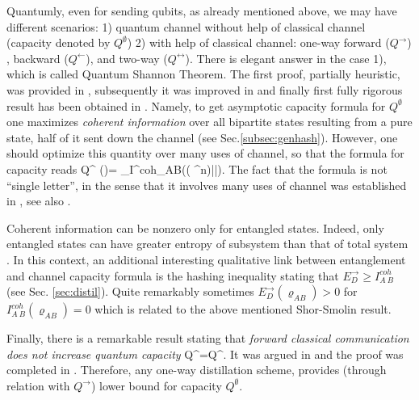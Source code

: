 \documentclass[rmp,12pt,preprint]{revtex4-2}
\begin{document}
Quantumly, even for sending qubits, as already mentioned above, we
may have different scenarios: 1) quantum channel without help of
classical channel (capacity denoted by $Q^{ \emptyset }$) 2) with
help of classical channel: one-way forward ($Q^{ \rightarrow }$) ,
backward ($Q^{ \leftarrow }$), and two-way ($Q^{ \leftrightarrow
}$). There is elegant answer in the case 1), which is called Quantum
Shannon Theorem. The first proof, partially heuristic, was provided
in \cite{Lloyd-cap}, subsequently it was improved in
\cite{Shor-cap-notes} and finally first fully rigorous result has been obtained
in \cite{Devetak2003}. Namely, to get asymptotic capacity
formula for $Q^{ \emptyset}$ one maximizes {\it coherent
information} over all bipartite states resulting from a pure state, half of it sent down the channel (see Sec.\ref{subsec:genhash}). However, one should optimize this quantity over many uses of channel, so that the formula for capacity reads
\be
Q^{ \emptyset }(\Lambda)=  \sup_\psi I^{coh}_{A\>B}((\id\ot
\Lambda^{\ot n})|\psi\>\<\psi|).
\ee
The fact that the formula is not ``single letter'', in the sense that it involves many uses of channel was established in \cite{ShorS1996-cohinf}, see also \cite{DSSVeryNoisy}.

Coherent information can be nonzero only for entangled states.
Indeed, only entangled states can have greater entropy of subsystem
than that of total system \cite{RPH1994}. In this context, an
additional interesting qualitative link between entanglement and
channel capacity formula is the hashing inequality stating
that $E_D^\rightarrow\geq I^{coh}_{A\>B}$ (see Sec. \ref{sec:distil}).
Quite remarkably sometimes $E_{D}^{\rightarrow}(\varrho_{AB})>0$ for
$I^{coh}_{A\>B}(\varrho_{AB})=0$  which is related to the above mentioned Shor-Smolin result.

Finally, there is a remarkable result stating that {\it forward
classical communication does not increase quantum capacity} \be
Q^{\emptyset}=Q^{\rightarrow}. \ee It was argued in \cite{BDSW1996}
and  the proof was completed in \cite{BarnumKN-cap-equiv}.
Therefore, any one-way distillation scheme, provides (through
relation with $Q^{\rightarrow}$) lower bound for capacity
$Q^{\emptyset}$.
\end{document}
